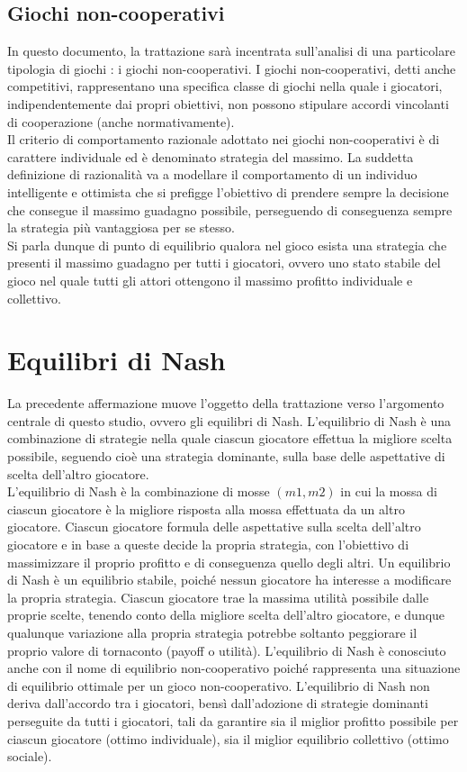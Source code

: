 \subsection{Giochi non-cooperativi}
\justify
In questo documento, la trattazione sarà incentrata sull'analisi di una particolare tipologia di giochi : i giochi non-cooperativi. I giochi non-cooperativi, detti anche competitivi, rappresentano una specifica classe di giochi nella quale i giocatori, indipendentemente dai propri obiettivi, non possono stipulare accordi vincolanti di cooperazione (anche normativamente).\\
Il criterio di comportamento razionale adottato nei giochi non-cooperativi è di carattere individuale ed è denominato strategia del massimo. La suddetta definizione di razionalità va a modellare il comportamento di un individuo intelligente e ottimista che si prefigge l'obiettivo di prendere sempre la decisione che consegue il massimo guadagno possibile, perseguendo di conseguenza sempre la strategia più vantaggiosa per se stesso.\\
Si parla dunque di punto di equilibrio qualora nel gioco esista una strategia che presenti il massimo guadagno per tutti i giocatori, ovvero uno stato stabile del gioco nel quale tutti gli attori ottengono il massimo profitto individuale e collettivo.\\

\section{Equilibri di Nash}
\justify
La precedente affermazione muove l'oggetto della trattazione verso l'argomento centrale di questo studio, ovvero gli equilibri di Nash. L'equilibrio di Nash è una combinazione di strategie nella quale ciascun giocatore effettua la migliore scelta possibile, seguendo cioè una strategia dominante, sulla base delle aspettative di scelta dell'altro giocatore. \\
L'equilibrio di Nash è la combinazione di mosse \((m1, m2)\) in cui la mossa di ciascun giocatore è la migliore risposta alla mossa effettuata da un altro giocatore. Ciascun giocatore formula delle aspettative sulla scelta dell'altro giocatore e in base a queste decide la propria strategia, con l'obiettivo di massimizzare il proprio profitto e di conseguenza quello degli altri. Un equilibrio di Nash è un equilibrio stabile, poiché nessun giocatore ha interesse a modificare la propria strategia. Ciascun giocatore trae la massima utilità possibile dalle proprie scelte, tenendo conto della migliore scelta dell'altro giocatore, e dunque qualunque variazione alla propria strategia potrebbe soltanto peggiorare il proprio valore di tornaconto (payoff o utilità). L'equilibrio di Nash è conosciuto anche con il nome di equilibrio non-cooperativo poiché rappresenta una situazione di equilibrio ottimale per un gioco non-cooperativo. L'equilibrio di Nash non deriva dall'accordo tra i giocatori, bensì dall'adozione di strategie dominanti perseguite da tutti i giocatori, tali da garantire sia il miglior profitto possibile per ciascun giocatore (ottimo individuale), sia il miglior equilibrio collettivo (ottimo sociale).\\

